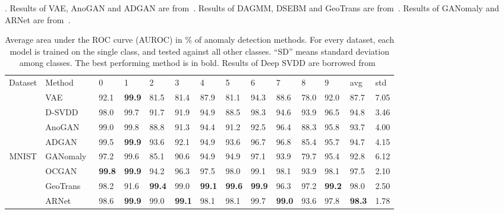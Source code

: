 \documentclass[journal]{IEEEtran}
\theoremstyle{remark}
\begin{document}
\renewcommand \arraystretch{0.9}
\begin{table*}[!htb]
\centering
\caption{Average area under the ROC curve (AUROC) in \% of anomaly detection methods. For every dataset, each model is trained on the single class, and tested against all other classes. ``SD'' means standard deviation among classes. The best performing method is in bold. Results of Deep SVDD are borrowed from~\cite{SVDD}}. Results of VAE, AnoGAN and ADGAN are from~\cite{deecke2018anomaly}. Results of DAGMM, DSEBM and GeoTrans are from~\cite{golan2018deep}. Results of GANomaly and ARNet are from~\cite{fye2020ARNet}. 
	\small
	\begin{minipage}[t]{0.95\textwidth}
	\begin{tabular}{cx{3.0cm}x{0.6cm}x{0.6cm}x{0.6cm}x{0.6cm}x{0.6cm}x{0.6cm}x{0.6cm}x{0.6cm}x{0.6cm}x{0.6cm}x{0.6cm}x{0.8cm}}
	\toprule
	Dataset & Method & 0 & 1 & 2 & 3 & 4 & 5 & 6 & 7 & 8 & 9 & avg & std\\
	\cmidrule(lr){1-1} \cmidrule(lr){2-2} \cmidrule(lr){3-3} \cmidrule(lr){4-4} \cmidrule(lr){5-5} \cmidrule(lr){6-6} \cmidrule(lr){7-7} \cmidrule(lr){8-8} \cmidrule(lr){9-9} \cmidrule(lr){10-10} \cmidrule(lr){11-11} \cmidrule(lr){12-12} \cmidrule(lr){13-13} \cmidrule(lr){14-14}
		& VAE~\cite{kingma2013auto} 
		& 92.1 & \textbf{99.9} & 81.5 & 81.4 & 87.9 & 81.1 & 94.3 & 88.6 & 78.0 & 92.0 & 87.7 & 7.05\\
		& D-SVDD~\cite{SVDD}
		& 98.0 & 99.7 & 91.7 & 91.9 & 94.9 & 88.5 & 98.3 & 94.6 & 93.9 & 96.5 & 94.8 & 3.46\\
		& AnoGAN~\cite{schlegl2017unsupervised}
		& 99.0 & 99.8 & 88.8 & 91.3 & 94.4 & 91.2 & 92.5 & 96.4 & 88.3 & 95.8 & 93.7 & 4.00\\
		& ADGAN~\cite{deecke2018anomaly} 
		& 99.5 & \textbf{99.9} & 93.6 & 92.1 & 94.9 & 93.6 & 96.7 & 96.8 & 85.4 & 95.7 & 94.7 & 4.15\\
		MNIST& GANomaly~\cite{Akcay2018} 
		& 97.2 & 99.6 & 85.1 & 90.6 & 94.9 & 94.9 & 97.1 & 93.9 & 79.7 & 95.4 & 92.8 & 6.12\\
		& OCGAN~\cite{OCGAN} 
		& \textbf{99.8} & \textbf{99.9} & 94.2 & 96.3 & 97.5 & 98.0 & 99.1 & 98.1 & 93.9 & 98.1 & 97.5 & 2.10\\
		& GeoTrans~\cite{golan2018deep} 
		& 98.2 & 91.6 & \textbf{99.4} & 99.0 & \textbf{99.1} & \textbf{99.6} & \textbf{99.9} & 96.3 & 97.2 & \textbf{99.2} & 98.0 & 2.50\\
		& ARNet~\cite{fye2020ARNet} & 98.6 & \textbf{99.9} & 99.0 & \textbf{99.1} & 98.1 & 98.1 & 99.7 & \textbf{99.0} & 93.6 & 97.8 & \textbf{98.3} & 1.78\\
		\cmidrule(lr){2-2} \cmidrule(lr){3-3} \cmidrule(lr){4-4} \cmidrule(lr){5-5} \cmidrule(lr){6-6} \cmidrule(lr){7-7} \cmidrule(lr){8-8} \cmidrule(lr){9-9} \cmidrule(lr){10-10} \cmidrule(lr){11-11} \cmidrule(lr){12-12} \cmidrule(lr){13-13} \cmidrule(lr){14-14}
        

\end{tabular}
\end{minipage}
\end{table*}
\end{document}
